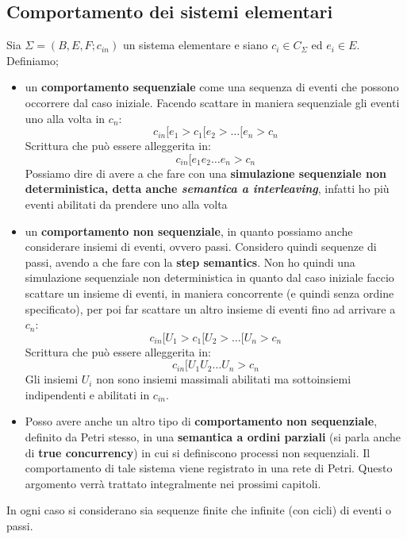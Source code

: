 \subsection{Comportamento dei sistemi elementari}
\begin{definizione}
  Sia $\Sigma=(B, E, F;c_{in})$ un sistema elementare e siano $c_i\in C_\Sigma$ ed
  $e_i\in E$.\\
  Definiamo;
  \begin{itemize}
    \item un \textbf{comportamento sequenziale} come una sequenza di eventi che
    possono occorrere dal caso iniziale. Facendo scattare in maniera sequenziale
    gli eventi uno alla volta in $c_n$:
    \[c_{in} [e_1 > c_1 [e_2 > \ldots[e_n > c_n\]
    Scrittura che può essere alleggerita in:
    \[c_{in} [e_1 e_2 \ldots e_n > c_n\]
    Possiamo dire di avere a che fare con una \textbf{simulazione sequenziale
      non deterministica, detta anche \textit{semantica a interleaving}},
    infatti ho più eventi abilitati da prendere uno alla volta
    \item un \textbf{comportamento non sequenziale}, in quanto possiamo anche
    considerare insiemi di eventi, ovvero passi. Considero quindi sequenze di
    passi, avendo a che fare con la \textbf{step semantics}. Non ho quindi una
    simulazione sequenziale non deterministica in quanto dal caso iniziale
    faccio scattare un insieme di eventi, in maniera concorrente (e quindi senza
    ordine specificato), per poi far scattare un altro insieme di eventi fino ad
    arrivare a $c_n$: 
    \[c_{in} [U_1 > c_1 [U_2 > \ldots [U_n > c_n\]
    Scrittura che può essere alleggerita in:
    \[c_{in} [U_1 U_2 \ldots U_n > c_n\]
    Gli insiemi $U_i$ non sono insiemi massimali abilitati ma sottoinsiemi
    indipendenti e abilitati in $c_{in}$.\\
\item    Posso avere anche un altro tipo di \textbf{comportamento non sequenziale},
    definito da Petri stesso, in una \textbf{semantica a ordini parziali} (si
    parla anche di \textbf{true concurrency}) in
    cui si definiscono processi non sequenziali. Il comportamento di tale
    sistema viene registrato in una rete di Petri. Questo argomento verrà trattato integralmente nei prossimi capitoli.
  \end{itemize}
  In ogni caso si considerano sia sequenze finite che infinite (con cicli) di
  eventi o passi. 
\end{definizione} \vspace{5mm} %
